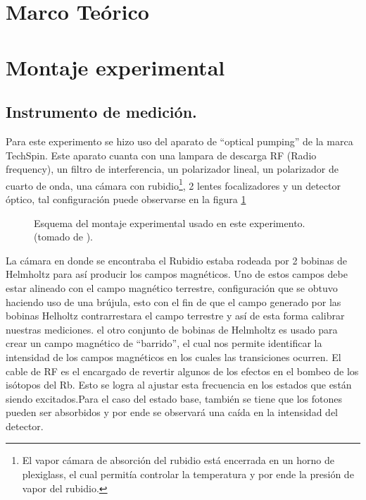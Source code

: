 \documentclass[%
 reprint,
 amsmath,amssymb,
 aps,
]{revtex4-1}
\begin{document}
 \section{Marco Teórico}
 
 
\section{Montaje experimental}
\subsection{Instrumento de medición.}
Para este experimento se hizo uso del aparato de ``optical pumping'' de la marca TechSpin. Este aparato cuanta con una lampara de descarga RF (Radio frequency), un filtro de interferencia, un polarizador lineal, un polarizador de cuarto de onda, una cámara con rubidio\footnote{El vapor cámara de absorción del rubidio está encerrada en un horno de plexiglass, el cual permitía controlar la temperatura y por ende la presión de vapor del rubidio.}, 2 lentes focalizadores y un detector óptico, tal configuración puede observarse en la figura \ref{montaje experimental}
\begin{figure}[ht]
\caption{\label{montaje experimental} Esquema del montaje experimental usado en este experimento.  (tomado de \cite{figura_aparato}).}
\end{figure}
La cámara en donde se encontraba el Rubidio estaba rodeada por 2 bobinas de Helmholtz para así producir los campos magnéticos. Uno de estos campos debe estar alineado con el campo magnético terrestre, configuración que se obtuvo haciendo uso de una brújula, esto con el fin de que el campo generado por las bobinas Helholtz contrarrestara el campo terrestre y así de esta forma calibrar nuestras mediciones. el otro conjunto de bobinas de Helmholtz es usado para crear un campo magnético de ``barrido'', el cual nos permite identificar la intensidad de los campos magnéticos en los cuales las transiciones ocurren.
El cable de RF es el encargado de revertir algunos de los efectos en el bombeo de los isótopos del Rb. Esto se logra al ajustar esta frecuencia en los estados que están siendo excitados.Para el caso del estado base, también se tiene que los fotones pueden ser absorbidos y por ende se observará una caída en la intensidad del detector.
\end{document}
